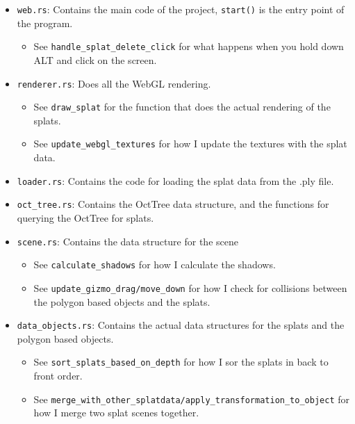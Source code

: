 \documentclass {article}
\begin{document}
\begin{itemize}
\item \lstinline[style=inlinecode]{web.rs}: Contains the main code of the project, \lstinline[style=inlinecode]{start()} is the entry point of the program.
    \begin{itemize}
        \item See \lstinline[style=inlinecode]{handle_splat_delete_click} for what happens when you hold down ALT and click on the screen.
    \end{itemize}
\item \lstinline[style=inlinecode]{renderer.rs}: Does all the WebGL rendering. 
    \begin{itemize}
        \item See \lstinline[style=inlinecode]{draw_splat} for the function that does the actual rendering of the splats.
        \item See \lstinline[style=inlinecode]{update_webgl_textures} for how I update the textures with the splat data.
    \end{itemize}
\item \lstinline[style=inlinecode]{loader.rs}: Contains the code for loading the splat data from the .ply file.
\item \lstinline[style=inlinecode]{oct_tree.rs}: Contains the OctTree data structure, and the functions for querying the OctTree for splats.
\item \lstinline[style=inlinecode]{scene.rs}: Contains the data structure for the scene
    \begin{itemize}
        \item See \lstinline[style=inlinecode]{calculate_shadows} for how I calculate the shadows.
        \item See \lstinline[style=inlinecode]{update_gizmo_drag/move_down} for how I check for collisions between the polygon based objects and the splats.
    \end{itemize}

\item \lstinline[style=inlinecode]{data_objects.rs}: Contains the actual data structures for the splats and the polygon based objects.
    \begin{itemize}
        \item See \lstinline[style=inlinecode]{sort_splats_based_on_depth} for how I sor the splats in back to front order.
        \item See \lstinline[style=inlinecode]{merge_with_other_splatdata/apply_transformation_to_object} for how I merge two splat scenes together.
    \end{itemize}
\end{itemize}
\end{document}
